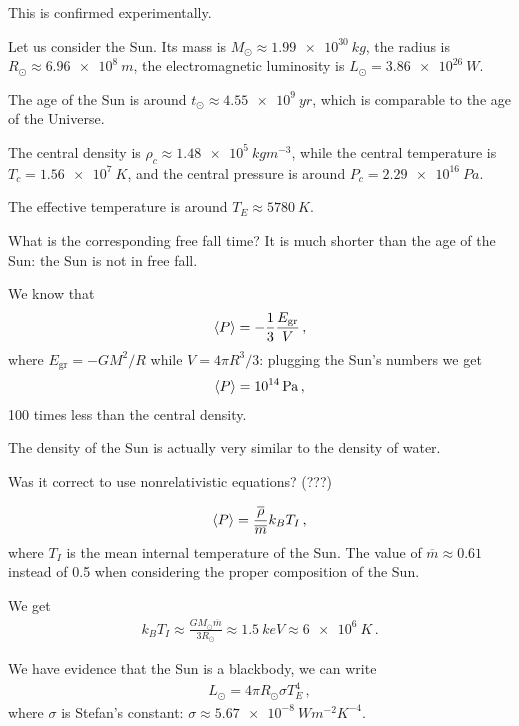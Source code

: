 \documentclass[main.tex]{subfiles}
\begin{document}
This is confirmed experimentally. 

Let us consider the Sun. Its mass is \(M_{\odot} \approx \SI{1.99e30}{kg}\), the radius is \(R_{\odot} \approx \SI{6.96e8}{m}\), the electromagnetic luminosity is \(L_{\odot} = \SI{3.86e26}{W}\). 

The age of the Sun is around \(t_{\odot} \approx \SI{4.55e9}{yr}\), which is comparable to the age of the Universe. 

The central density is \(\rho _c \approx \SI{1.48e5}{kg m^{-3}}\), while the central temperature is \(T_c = \SI{1.56e7}{K}\), and the central pressure is around \(P_c = \SI{2.29e16}{Pa}\).  

The effective temperature is around \(T_E \approx \SI{5780}{K}\). 

What is the corresponding free fall time? It is much shorter than the age of the Sun: the Sun is not in free fall. 

We know that 
%
\begin{align}
  \expval{P} = -\frac{1}{3} \frac{E _{\text{gr}}}{V}
\,,
\end{align}
%
where \(E _{\text{gr}} = - G M^2/R\) while \(V = 4 \pi R^3/3\): plugging the Sun's numbers we get 
%
\begin{align}
  \expval{P} = \SI{e14}{Pa}
\,,
\end{align}
%
100 times less than the central density. 

The density of the Sun is actually very similar to the density of water. 

Was it correct to use nonrelativistic equations? (???)

%
\begin{align}
  \expval{P} = \frac{\overline{\rho}}{\overline{m}} k_B T_I
\,,
\end{align}
%
where \(T_I\) is the mean internal temperature of the Sun. 
The value of \(\overline{m} \approx 0.61\) instead of 0.5 when considering the proper composition of the Sun. 

We get 
%
\begin{align}
  k_B T_I \approx \frac{G M_{\odot} \overline{m}}{3 R_{\odot} } \approx \SI{1.5}{keV} \approx \SI{6e6}{K}
\,.
\end{align}

We have evidence that the Sun is a blackbody, we can write 
%
\begin{align}
  L_{\odot} = 4 \pi R_{\odot} \sigma T^{4}_{E}
\,,
\end{align}
%
where \(\sigma \) is Stefan's constant: \(\sigma \approx \SI{5.67e-8}{W m^{-2} K^{-4}}\). 
\end{document}
